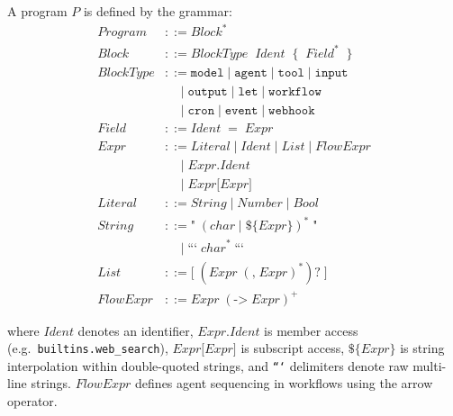 \documentclass[sigconf,nonacm]{acmart}
\begin{document}
\begin{definition}\label{def:grammar}
A program $P$ is defined by the grammar:
\begin{align}
  \mathit{Program}   &::= \mathit{Block}^* \\
  \mathit{Block}     &::= \mathit{BlockType} \;\; \mathit{Ident} \;\; \texttt{\{} \;\; \mathit{Field}^* \;\; \texttt{\}} \\
  \mathit{BlockType} &::= \texttt{model} \mid \texttt{agent} \mid \texttt{tool} \mid \texttt{input} \nonumber \\
                     &\quad\mid \texttt{output} \mid \texttt{let} \mid \texttt{workflow} \nonumber \\
                     &\quad\mid \texttt{cron} \mid \texttt{event} \mid \texttt{webhook} \\
  \mathit{Field}     &::= \mathit{Ident} \;\; \texttt{=} \;\; \mathit{Expr} \\
  \mathit{Expr}      &::= \mathit{Literal} \mid \mathit{Ident} \mid \mathit{List} \mid \mathit{FlowExpr} \nonumber \\
                     &\quad\mid \mathit{Expr}\texttt{.}\mathit{Ident} \nonumber \\
                     &\quad\mid \mathit{Expr}\texttt{[}\mathit{Expr}\texttt{]} \\
  \mathit{Literal}   &::= \mathit{String} \mid \mathit{Number} \mid \mathit{Bool} \\
  \mathit{String}    &::= \texttt{"} \; (\mathit{char} \mid \texttt{\$\{} \mathit{Expr} \texttt{\}})^* \; \texttt{"} \nonumber \\
                     &\quad\mid \texttt{```} \; \mathit{char}^* \; \texttt{```} \\
  \mathit{List}      &::= \texttt{[} \; (\mathit{Expr} \; (\texttt{,} \; \mathit{Expr})^*)? \; \texttt{]} \\
  \mathit{FlowExpr}  &::= \mathit{Expr} \; (\texttt{->} \; \mathit{Expr})^+
\end{align}
\end{definition}

\noindent where $\mathit{Ident}$ denotes an identifier,
$\mathit{Expr}\texttt{.}\mathit{Ident}$ is member access (e.g.\
\texttt{builtins.web\_search}),
$\mathit{Expr}\texttt{[}\mathit{Expr}\texttt{]}$ is subscript access,
$\texttt{\$\{}\mathit{Expr}\texttt{\}}$ is string interpolation within
double-quoted strings, and \texttt{```} delimiters denote raw
multi-line strings. $\mathit{FlowExpr}$ defines agent sequencing in
workflows using the arrow operator.
\end{document}
